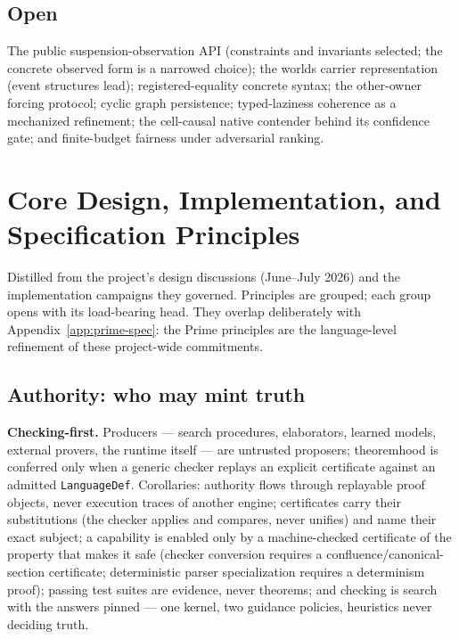 \documentclass[11pt]{article}
\newcommand{\code}[1]{\texttt{#1}}
\begin{document}
\subsection{Open}

The public suspension-observation API (constraints and invariants
selected; the concrete observed form is a narrowed choice); the worlds
carrier representation (event structures lead); registered-equality
concrete syntax; the other-owner forcing protocol; cyclic graph
persistence; typed-laziness coherence as a mechanized refinement; the
cell-causal native contender behind its confidence gate; and
finite-budget fairness under adversarial ranking.

\section{Core Design, Implementation, and Specification
Principles}
\label{app:principles}

Distilled from the project's design discussions (June--July 2026) and the
implementation campaigns they governed.  Principles are grouped; each group
opens with its load-bearing head.  They overlap deliberately with
Appendix~\ref{app:prime-spec}: the Prime principles are the language-level
refinement of these project-wide commitments.

\subsection{Authority: who may mint truth}
\textbf{Checking-first.}  Producers --- search procedures, elaborators,
learned models, external provers, the runtime itself --- are untrusted
proposers; theoremhood is conferred only when a generic checker replays an
explicit certificate against an admitted \code{LanguageDef}.  Corollaries:
authority flows through replayable proof objects, never execution traces
of another engine; certificates carry their substitutions (the checker
applies and compares, never unifies) and name their exact subject; a
capability is enabled only by a machine-checked certificate of the
property that makes it safe (checker conversion requires a
confluence/canonical-section certificate; deterministic parser
specialization requires a determinism proof); passing test suites are
evidence, never theorems; and checking is search with the answers pinned
--- one kernel, two guidance policies, heuristics never deciding truth.
\end{document}
